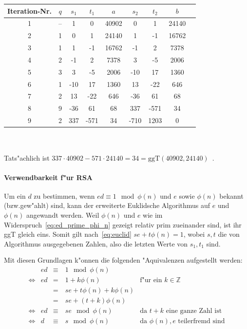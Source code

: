 \documentclass[12pt]{article}
\begin{document}
\begin{tabular}{c|c c c c c c c l}
    Iteration-Nr. & $q$ & $s_1$ & $t_1$ & $a$ & $s_2$ & $t_2$ & $b$ \\
    \hline
    1 & -- & 1 & 0 & 40902 & 0 & 1 & 24140 \\
    2 & 1 & 0 & 1 & 24140 & 1 & -1 & 16762 \\
    3 & 1 & 1 & -1 & 16762 & -1 & 2 & 7378 \\
    4 & 2 & -1 & 2 & 7378 & 3 & -5 & 2006 \\
    5 & 3 & 3 & -5 & 2006 & -10 & 17 & 1360 \\
    6 & 1 & -10 & 17 & 1360 & 13 & -22 & 646 \\
    7 & 2 & 13 & -22 & 646 & -36 & 61 & 68 \\
    8 & 9 & -36 & 61 & 68 & 337 & -571 & 34 \\
    9 & 2 & 337 & -571 & 34 & -710 & 1203 & 0 \\
\end{tabular}
~\\~\\
\noindent
Tats"achlich ist $337 \cdot 40902 - 571 \cdot 24140 = 34 = \textrm{ggT}(40902, 24140)$~\cite{taocp2}.

\paragraph{Verwendbarkeit f"ur RSA}

Um ein $d$ zu bestimmen, wenn $ed \equiv 1 \mod \phi(n) $ und $e$ sowie $\phi(n)$ bekannt (bzw.\@ gew"ahlt) sind,
kann der erweiterte Euklidsche Algorithmus auf $e$ und $\phi(n)$ angewandt werden.
Weil $\phi(n)$ und $e$ wie im Widerspruch~\eqref{eq:ed_prime_phi_n} gezeigt relativ prim zueinander sind, ist ihr ggT gleich eins.
Somit gilt nach~\eqref{eq:euclid} $se + t\phi(n) = 1$, wobei $s, t$ die von Algorithmus ausgegebenen
Zahlen, also die letzten Werte von $s_1, t_1$ sind.

\noindent Mit diesen Grundlagen k"onnen die folgenden "Aquivalenzen aufgestellt werden:
\begin{equation}
\label{eq:d_is_s}
\begin{aligned}
      &ed &\equiv&~1 \mod \phi(n)& \\
      \iff&ed &=&~1 + k \phi(n) &\textrm{f"ur ein }k \in \mathbb{Z}\\
      &&=&~se + t\phi(n) + k\phi(n)& \\
      &&=&~se + (t+k)\phi(n) &\\
      \iff& ed &\equiv&~se \mod \phi(n) &\textrm{da }t+k\textrm{ eine ganze Zahl ist}\\
      \iff& d &\equiv&~s \mod \phi(n)& \textrm{da }\phi(n), e\textrm{ teilerfremd sind}
\end{aligned}
\end{equation}
\end{document}
